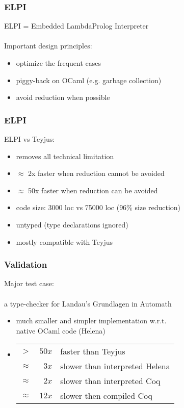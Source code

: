 \documentclass{beamer}
\begin{document}
\begin{frame}
 \frametitle{ELPI}

 ELPI = Embedded LambdaProlog Interpreter\\~\\

 Important design principles:
 \begin{itemize}
  \item optimize the frequent cases
  \item piggy-back on OCaml (e.g. garbage collection)
  \item \alert{avoid reduction} when possible
 \end{itemize}
\end{frame}

\begin{frame}
 \frametitle{ELPI}
 ELPI vs Teyjus:\\
 \begin{itemize}
  \item removes all technical limitation
  \item $\approx$ \alert{2x faster} when reduction cannot be avoided
  \item $\approx$ \alert{50x faster} when reduction can be avoided
  \item code size: 3000 loc vs 75000 loc (\alert{96\% size reduction})
  \item untyped (type declarations ignored)
  \item mostly \alert{compatible} with Teyjus
 \end{itemize}
\end{frame}

\begin{frame}
 \frametitle{Validation}
 Major test case:\\~\\
 a type-checker for \alert{Landau's Grundlagen in Automath}\\
 \begin{itemize}
 \item much smaller and simpler implementation w.r.t.\\
       native OCaml code (Helena)
 \item \begin{tabular}[t]{lrl}
       $>$ & $50x$ & faster than Teyjus\\
       $\approx$ & $3x$ & slower than interpreted Helena\\
       $\approx$ & $2x$ & slower than interpreted Coq\\
       $\approx$ & $12x$ & slower then compiled Coq
       \end{tabular}
 \end{itemize}

\end{frame}
\end{document}
